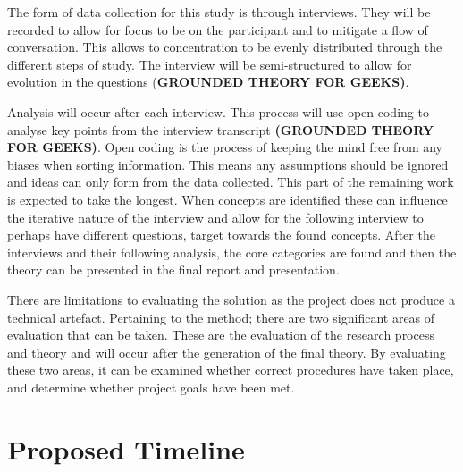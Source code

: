 \par The form of data collection for this study is through interviews. They will be recorded to allow for focus to be on the participant and to mitigate a flow of conversation. This allows to concentration to be evenly distributed through the different steps of study. The interview will be semi-structured to allow for evolution in the questions (\textbf{GROUNDED THEORY FOR GEEKS)}. 
\newline
\par Analysis will occur after each interview. This process will use open coding to analyse key points from the interview transcript\textbf{ (GROUNDED THEORY FOR GEEKS)}. Open coding is the process of keeping the mind free from any biases when sorting information. This means any assumptions should be ignored and ideas can only form from the data collected. This part of the remaining work is expected to take the longest. When concepts are identified these can influence the iterative nature of the interview and allow for the following interview to perhaps have different questions, target towards the found concepts. After the interviews and their following analysis, the core categories are found and then the theory can be presented in the final report and presentation. 
\newline
\par 
There are limitations to evaluating the solution as the project does not produce a technical artefact. Pertaining to the method; there are two significant areas of evaluation that can be taken. These are the evaluation of the research process and theory and will occur after the generation of the final theory. By evaluating these two areas, it can be examined whether correct procedures have taken place, and determine whether project goals have been met.
 
\section{Proposed Timeline}

